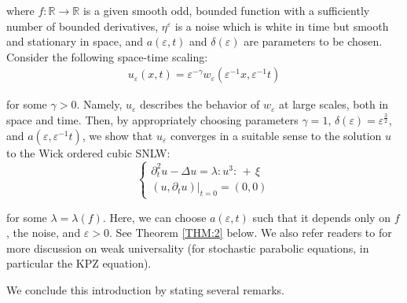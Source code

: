 \documentclass[letterpaper, 11pt,  reqno]{amsart}
\newcommand{\1}{\hspace{0.5mm}\text{I}\hspace{0.5mm}}
\newcommand{\noi}{\noindent}
\newcommand{\R}{\mathbb{R}}
\newcommand{\Dl}{\Delta}
\newcommand{\eps}{\varepsilon}
\newcommand{\g}{\gamma}
\newcommand{\ld}{\lambda}
\newcommand{\dt}{\partial_t}
\numberwithin{equation}{section}
\numberwithin{theorem}{section}
\begin{document}
\noi
where $f: \R \to \R$ is a given smooth odd, bounded function
with a sufficiently number of bounded derivatives,
 $\eta^\eps$ is a noise which is white in time but
smooth and stationary in space,
and $a (\eps, t)$ and $\delta(\eps)$ are parameters to be chosen.
Consider the following space-time scaling:
\begin{align*}
u_{\eps} (x, t) = \eps^{- \g} w_\eps (\eps^{-1} x, \eps^{-1} t)
\end{align*}

\noi
for some $\g > 0$.
Namely, $u_\eps$ describes the behavior of $w_\eps$ at large scales, 
both in space and time.
Then, by appropriately choosing 
 parameters  $\g = 1$,   $\delta(\eps) = \eps^{\frac 32}$, and
 $a (\eps, \eps^{-1} t)$, 
 we show that $u_\eps$ converges in a suitable sense to 
  the solution $u$ to the Wick ordered cubic SNLW:
  \begin{equation*}
\begin{cases}
\dt^2 u - \Dl  u = \lambda : \!u^3 \!: \, + \, \xi\\
 (u, \dt u) |_{t = 0} = (0, 0)
\end{cases}
  \end{equation*}

\noi
for some $\ld = \ld(f)$.
Here, we can choose  
 $a(\eps, t)$ such that it depends only on $f$, the noise, and $\eps > 0$.
See Theorem \ref{THM:2} below.
We also refer readers to 
\cite{HQ, GP1, GP2} for more discussion on weak universality 
(for stochastic parabolic equations, in particular the KPZ equation).

\medskip

We conclude this introduction by stating several remarks.
\end{document}
